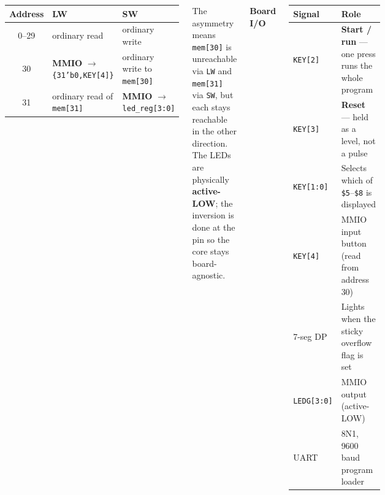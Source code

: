 \documentclass[
  25pt,
  margin=0.8in,
  innermargin=0.6in,
  colspace=0.8in,
  blockverticalspace=0.32in
]{tikzposter}
\renewcommand{\arraystretch}{1.15}
\newcommand{\hdr}[1]{\textbf{#1}}
\begin{document}
\begin{columns}
{  \vspace{0.5em}
  \begin{center}
  \renewcommand{\arraystretch}{1.12}
  \begin{tabularx}{\linewidth}{@{}cl>{\raggedright\arraybackslash}X@{}}
  \toprule
  \textbf{Address} & \textbf{LW} & \textbf{SW} \\
  \midrule
  0--29 & ordinary read & ordinary write \\
  30    & \textbf{MMIO} $\to$ \texttt{\{31'b0,KEY[4]\}} & ordinary write to \texttt{mem[30]} \\
  31    & ordinary read of \texttt{mem[31]} & \textbf{MMIO} $\to$ \texttt{led\_reg[3:0]} \\
  \bottomrule
  \end{tabularx}
  \end{center}
  \vspace{0.3em}
  The asymmetry means \texttt{mem[30]} is unreachable via \texttt{LW} and
  \texttt{mem[31]} via \texttt{SW}, but each stays reachable in the other
  direction. The LEDs are physically \textbf{active-LOW}; the inversion is
  done at the pin so the core stays board-agnostic.

  \vspace{0.7em}
  \hdr{Board I/O}
  \vspace{0.4em}
  \begin{center}
  \renewcommand{\arraystretch}{1.12}
  \begin{tabular}{@{}ll@{}}
  \toprule
  \textbf{Signal} & \textbf{Role} \\
  \midrule
  \texttt{KEY[2]}   & \textbf{Start / run} --- one press runs the whole program \\
  \texttt{KEY[3]}   & \textbf{Reset} --- held as a level, not a pulse \\
  \texttt{KEY[1:0]} & Selects which of \texttt{\$5}--\texttt{\$8} is displayed \\
  \texttt{KEY[4]}   & MMIO input button (read from address 30) \\
  7-seg DP          & Lights when the sticky overflow flag is set \\
  \texttt{LEDG[3:0]} & MMIO output (active-LOW) \\
  UART              & 8N1, 9600 baud program loader \\
  \bottomrule
  \end{tabular}
  \end{center}
}
\end{columns}
\end{document}
